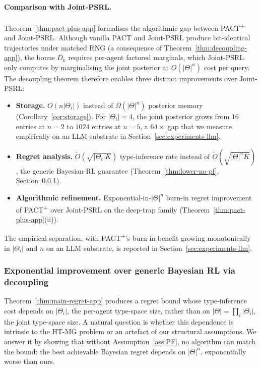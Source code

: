 \paragraph{Comparison with Joint-PSRL.} Theorem~\ref{thm:pact-plus-app} formalises the algorithmic gap between PACT\textsuperscript{+} and Joint-PSRL. Although vanilla PACT and Joint-PSRL produce bit-identical trajectories under matched RNG (a consequence of Theorem~\ref{thm:decoupling-app}), the bonus $D_k$ requires per-agent factored marginals, which Joint-PSRL only computes by marginalising the joint posterior at $O(|\Theta|^n)$ cost per query. The decoupling theorem therefore enables three distinct improvements over Joint-PSRL:
\begin{itemize}
\item \textbf{Storage.} $O(n|\Theta_i|)$ instead of $\Omega(|\Theta|^n)$ posterior memory (Corollary~\ref{cor:storage}). For $|\Theta_i| = 4$, the joint posterior grows from $16$ entries at $n=2$ to $1024$ entries at $n=5$, a $64\times$ gap that we measure empirically on an LLM substrate in Section~\ref{sec:experiments-llm}.
\item \textbf{Regret analysis.} $\tilde O(\sqrt{|\Theta_i| K})$ type-inference rate instead of $\tilde O(\sqrt{|\Theta|^n K})$, the generic Bayesian-RL guarantee (Theorem~\ref{thm:lower-no-pf}, Section~\ref{sec:exponential-improvement}).
\item \textbf{Algorithmic refinement.} Exponential-in-$|\Theta|^n$ burn-in regret improvement of PACT\textsuperscript{+} over Joint-PSRL on the deep-trap family (Theorem~\ref{thm:pact-plus-app}(ii)).
\end{itemize}
The empirical separation, with PACT\textsuperscript{+}'s burn-in benefit growing monotonically in $|\Theta_i|$ and $n$ on an LLM substrate, is reported in Section~\ref{sec:experiments-llm}.

\subsubsection{Exponential improvement over generic Bayesian RL via decoupling}
\label{sec:exponential-improvement}

Theorem~\ref{thm:main-regret-app} produces a regret bound whose type-inference cost depends on $|\Theta_i|$, the per-agent type-space size, rather than on $|\Theta| = \prod_i |\Theta_i|$, the joint type-space size. A natural question is whether this dependence is intrinsic to the HT-MG problem or an artefact of our structural assumptions. We answer it by showing that without Assumption~\ref{ass:PF}, no algorithm can match the bound: the best achievable Bayesian regret depends on $|\Theta|^n$, exponentially worse than ours.

